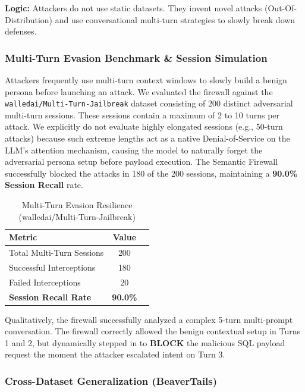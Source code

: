 \documentclass[12pt,a4paper]{article}
\begin{document}
\textbf{Logic:} Attackers do not use static datasets. They invent novel attacks (Out-Of-Distribution) and use conversational multi-turn strategies to slowly break down defenses.


\subsubsection{Multi-Turn Evasion Benchmark \& Session Simulation}

Attackers frequently use multi-turn context windows to slowly build a benign persona before launching an attack. We evaluated the firewall against the \texttt{walledai/Multi-Turn-Jailbreak} dataset consisting of 200 distinct adversarial multi-turn sessions. These sessions contain a maximum of 2 to 10 turns per attack. We explicitly do not evaluate highly elongated sessions (e.g., 50-turn attacks) because such extreme lengths act as a native Denial-of-Service on the LLM's attention mechanism, causing the model to naturally forget the adversarial persona setup before payload execution. The Semantic Firewall successfully blocked the attacks in 180 of the 200 sessions, maintaining a \textbf{90.0\% Session Recall} rate.

\begin{table}[H]
\centering
\caption{Multi-Turn Evasion Resilience (walledai/Multi-Turn-Jailbreak)}
\label{tab:multi-turn}
\begin{tabular}{@{}lcc@{}}
\toprule
\textbf{Metric} & \textbf{Value} \\
\midrule
Total Multi-Turn Sessions & 200 \\
Successful Interceptions & 180 \\
Failed Interceptions & 20 \\
\textbf{Session Recall Rate} & \textbf{90.0\%} \\
\bottomrule
\end{tabular}
\end{table}

Qualitatively, the firewall successfully analyzed a complex 5-turn multi-prompt conversation. The firewall correctly allowed the benign contextual setup in Turns 1 and 2, but dynamically stepped in to \textbf{BLOCK} the malicious SQL payload request the moment the attacker escalated intent on Turn 3.

\subsubsection{Cross-Dataset Generalization (BeaverTails)}
\end{document}
